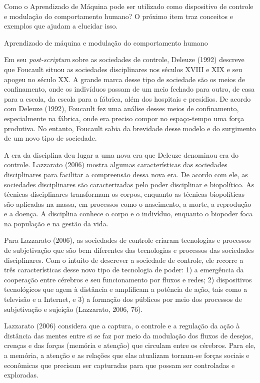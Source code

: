 Como o Aprendizado de Máquina pode ser utilizado como dispositivo de
controle e modulação do comportamento humano? O próximo item traz
conceitos e exemplos que ajudam a elucidar isso.

Aprendizado de máquina e modulação do comportamento humano

Em seu \emph{post-scriptum} sobre as sociedades de controle, Deleuze
(1992) descreve que Foucault situou as sociedades disciplinares nos
séculos XVIII e XIX e seu apogeu no século XX. A grande marca desse tipo
de sociedade são os meios de confinamento, onde os indivíduos passam de
um meio fechado para outro, de casa para a escola, da escola para a
fábrica, além dos hospitais e presídios. De acordo com Deleuze (1992),
Foucault fez uma análise desses meios de confinamento, especialmente na
fábrica, onde era preciso compor no espaço-tempo uma força produtiva. No
entanto, Foucault sabia da brevidade desse modelo e do surgimento de um
novo tipo de sociedade.

A era da disciplina deu lugar a uma nova era que Deleuze denominou era
do controle. Lazzarato (2006) mostra algumas características das
sociedades disciplinares para facilitar a compreensão dessa nova era. De
acordo com ele, as sociedades disciplinares são caracterizadas pelo
poder disciplinar e biopolítico. As técnicas disciplinares transformam
os corpos, enquanto as técnicas biopolíticas são aplicadas na massa, em
processos como o nascimento, a morte, a reprodução e a doença. A
disciplina conhece o corpo e o indivíduo, enquanto o biopoder foca na
população e na gestão da vida.

Para Lazzarato (2006), as sociedades de controle criaram tecnologias e
processos de subjetivação que são bem diferentes das tecnologias e
processos das sociedades disciplinares. Com o intuito de descrever a
sociedade de controle, ele recorre a três características desse novo
tipo de tecnologia de poder: 1) a emergência da cooperação entre
cérebros e seu funcionamento por fluxos e redes; 2) dispositivos
tecnológicos que agem à distância e amplificam a potência de ação, tais
como a televisão e a Internet, e 3) a formação dos públicos por meio dos
processos de subjetivação e sujeição (Lazzarato, 2006, 76).

Lazzarato (2006) considera que a captura, o controle e a regulação da
ação à distância das mentes entre si se faz por meio da modulação dos
fluxos de desejos, crenças e das forças (memória e atenção) que circulam
entre os cérebros. Para ele, a memória, a atenção e as relações que elas
atualizam tornam-se forças sociais e econômicas que precisam ser
capturadas para que possam ser controladas e exploradas.

